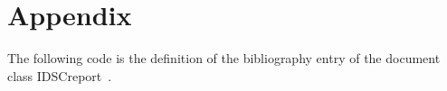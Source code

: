 
\chapter{Appendix}
\label{chp:Appendix}

The following code is the definition of the bibliography entry of the document class IDSCreport~\cite{IDSCreportClass}.

